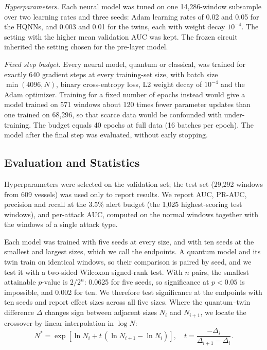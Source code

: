 \documentclass[journal]{IEEEtran}
\begin{document}
\textit{Hyperparameters.} Each neural model was tuned on one 14,286-window
subsample over two learning rates and three seeds: Adam learning rates of 0.02
and 0.05 for the HQNNs, and 0.003 and 0.01 for the twins, each with weight
decay $10^{-4}$. The setting with the higher mean validation AUC was kept. The
frozen circuit inherited the setting chosen for the pre-layer model.

\textit{Fixed step budget.} Every neural model, quantum or classical, was
trained for exactly 640 gradient steps at every training-set size, with batch
size $\min(4096, N)$, binary cross-entropy loss, L2 weight decay of $10^{-4}$
and the Adam optimizer. Training for a fixed number of epochs instead would give
a model trained on 571 windows about 120 times fewer parameter updates than one
trained on 68,296, so that scarce data would be confounded with
under-training. The budget equals 40 epochs at full data (16 batches per epoch).
The model after the final step was evaluated, without early stopping.

\subsection{Evaluation and Statistics}
Hyperparameters were selected on the validation set; the test set
(29,292 windows from 609 vessels) was used only to report results. We report
AUC, PR-AUC, precision and recall at the 3.5\% alert budget (the 1,025
highest-scoring test windows), and per-attack AUC, computed on the normal
windows together with the windows of a single attack type.

Each model was trained with five seeds at every size, and with ten seeds at the
smallest and largest sizes, which we call the endpoints. A quantum model and its
twin train on identical windows, so their comparison is paired by seed, and we
test it with a two-sided Wilcoxon signed-rank test. With $n$ pairs, the
smallest attainable $p$-value is $2/2^n$: 0.0625 for five seeds, so significance
at $p<0.05$ is impossible, and 0.002 for ten. We therefore test significance at
the endpoints with ten seeds and report effect sizes across all five sizes.
Where the quantum--twin difference $\Delta$ changes sign between adjacent sizes
$N_i$ and $N_{i+1}$, we locate the crossover by linear interpolation in
$\log N$:
\begin{equation}
N^{*} = \exp\!\left[\ln N_i + t\,(\ln N_{i+1}-\ln N_i)\right],\quad
t = \frac{-\Delta_i}{\Delta_{i+1}-\Delta_i}.
\label{eq:crossover}
\end{equation}
\end{document}
